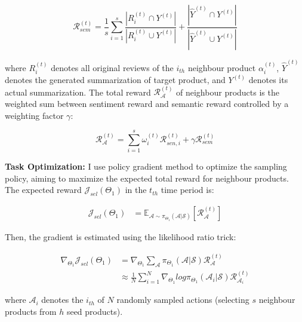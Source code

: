 \begin{equation}
\mathcal{R}_{sem}^{(t)} = \frac{1}{s}\sum_{i=1}^{s} \frac{|R_{i}^{(t)} \cap Y^{(t)}|}{|R_{i}^{(t)} \cup Y^{(t)}|} + \frac{|\hat{Y}^{(t)} \cap Y^{(t)}|}{|\hat{Y}^{(t)} \cup Y^{(t)}|} 
\end{equation}

where $R_{i}^{(t)}$ denotes all original reviews of the $i_{th}$ neighbour product $\alpha_{i}^{(t)}$, $\hat{Y}^{(t)}$ denotes the generated summarization of target product, and $Y^{(t)}$ denotes its actual summarization. The total reward $\mathcal{R}^{(t)}_{\mathcal{A}}$ of neighbour products is the weighted sum between sentiment reward and semantic reward controlled by a weighting factor $\gamma$:


\begin{equation}
\mathcal{R}^{(t)}_{\mathcal{A}} = \sum_{i=1}^{s} \omega_{i}^{(t)}\mathcal{R}_{sen,i}^{(t)} +\gamma \mathcal{R}_{sem}^{(t)}
\end{equation}

\textbf{Task Optimization:} I use policy gradient method to optimize the sampling policy, aiming to maximize the expected total reward for neighbour products. The expected reward $\mathcal{J}_{sel}(\Theta_{1})$ in the $t_{th}$ time period is:

\begin{equation}
\begin{aligned}
\mathcal{J}_{sel}(\Theta_{1}) &= \mathbb{E}_{\mathcal{A} \sim \pi_{\Theta_{1}}(\mathcal{A}|\mathcal{S})}[\mathcal{R}^{(t)}_{\mathcal{A}}]
\end{aligned}
\end{equation}

Then, the gradient is estimated using the likelihood ratio trick:

\begin{equation}
\label{eq:loss_1}
\begin{aligned}
\nabla_{\Theta_{1}}\mathcal{J}_{sel}(\Theta_{1}) &= \nabla_{\Theta_{1}} \sum_{\mathcal{A}} \pi_{\Theta_{1}}(\mathcal{A}|\mathcal{S}) \mathcal{R}^{(t)}_{\mathcal{A}}\\
&\approx \frac{1}{N} \sum_{i=1}^{N}\nabla_{\Theta_{1}}log\pi_{\Theta_{1}}(\mathcal{A}_{i}|\mathcal{S})\mathcal{R}^{(t)}_{\mathcal{A}_{i}}
\end{aligned}
\end{equation}

where $\mathcal{A}_{i}$ denotes the $i_{th}$ of $N$ randomly sampled actions (selecting $s$ neighbour products from $h$ seed products). 

